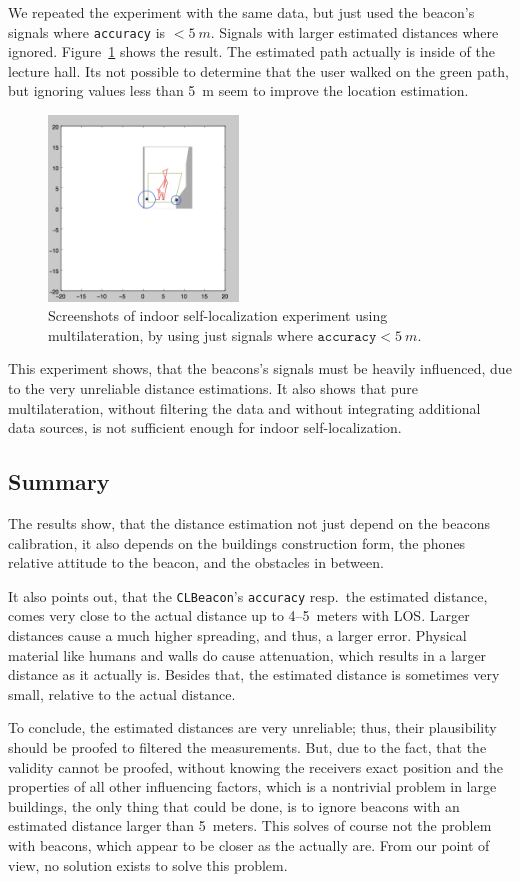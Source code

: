 We repeated the experiment with the same data, but just used the beacon's signals where \texttt{accuracy} is $< 5~m$. Signals with larger estimated distances where ignored. Figure~\ref{fig:beacon_eval_multilat_less5m} shows the result. The estimated path actually is inside of the lecture hall. Its not possible to determine that the user walked on the green path, but ignoring values less than 5~m seem to improve the location estimation.

\begin{figure}
	\includegraphics[width=0.45\textwidth]{figures/multilat_less5m}
	\caption{Screenshots of indoor self-localization experiment using multilateration, by using just signals where $\texttt{accuracy} < 5~m$.}
  \label{fig:beacon_eval_multilat_less5m}
\end{figure}

This experiment shows, that the beacons's signals must be heavily influenced, due to the very unreliable distance estimations. It also shows that pure multilateration, without filtering the data and without integrating additional data sources, is not sufficient enough for indoor self-localization.

\subsection{Summary}
The results show, that the distance estimation not just depend on the beacons calibration, it also depends on the buildings construction form, the phones relative attitude to the beacon, and the obstacles in between.

It also points out, that the \texttt{CLBeacon}'s \texttt{accuracy} resp.\ the estimated distance, comes very close to the actual distance up to 4--5~meters with \acs{LOS}. Larger distances cause a much higher spreading, and thus, a larger error. Physical material like humans and walls do cause attenuation, which results in a larger distance as it actually is. Besides that, the estimated distance is sometimes very small, relative to the actual distance.

To conclude, the estimated distances are very unreliable; thus, their plausibility should be proofed to filtered the measurements. But, due to the fact, that the validity cannot be proofed, without knowing the receivers exact position and the properties of all other influencing factors, which is a nontrivial problem in large buildings, the only thing that could be done, is to ignore beacons with an estimated distance larger than 5~meters. This solves of course not the problem with beacons, which appear to be closer as the actually are. From our point of view, no solution exists to solve this problem.